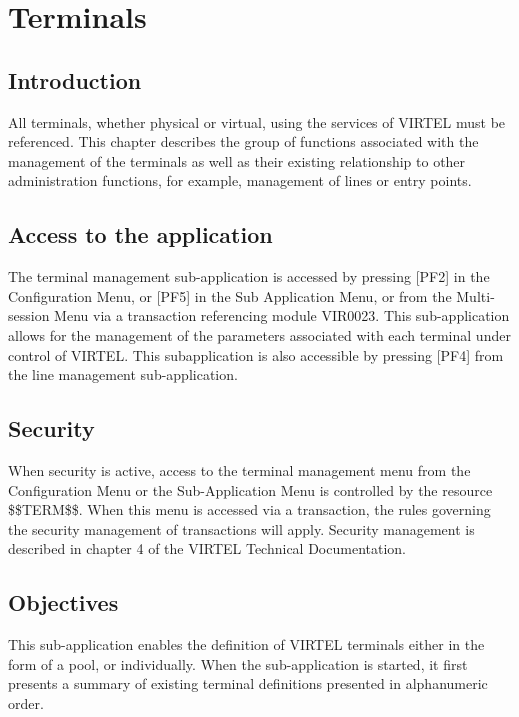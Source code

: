\documentclass[letterpaper,10pt,english]{sphinxmanual}
\begin{document}
\chapter{Terminals}
\label{\detokenize{connectivity_guide:terminals}}

\section{Introduction}
\label{\detokenize{connectivity_guide:id4}}
All terminals, whether physical or virtual, using the services of VIRTEL must be referenced. This chapter describes the group of functions associated with the management of the terminals as well as their existing relationship to other administration functions, for example, management of lines or entry points.


\section{Access to the application}
\label{\detokenize{connectivity_guide:access-to-the-application}}
The terminal management sub-application is accessed by pressing {[}PF2{]} in the Configuration Menu, or {[}PF5{]} in the Sub Application Menu, or from the Multi-session Menu via a transaction referencing module VIR0023. This sub-application allows for the management of the parameters associated with each terminal under control of VIRTEL. This subapplication
is also accessible by pressing {[}PF4{]} from the line management sub-application.


\section{Security}
\label{\detokenize{connectivity_guide:security}}
When security is active, access to the terminal management menu from the Configuration Menu or the Sub-Application Menu is controlled by the resource \$\$TERM\$\$. When this menu is accessed via a transaction, the rules governing the security management of transactions will apply. Security management is described in chapter 4 of the VIRTEL Technical Documentation.


\section{Objectives}
\label{\detokenize{connectivity_guide:objectives}}
This sub-application enables the definition of VIRTEL terminals either in the form of a pool, or individually. When the
sub-application is started, it first presents a summary of existing terminal definitions presented in alphanumeric order.
\end{document}
